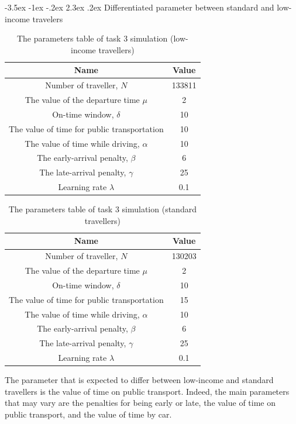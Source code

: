 \documentclass[a4paper, 12pt,oneside]{article}
\makeatletter
\renewcommand{\subsection}{\@startsection {subsection}{1}{\z@}%
             {-3.5ex \@plus -1ex \@minus -.2ex}%
             {2.3ex \@plus.2ex}%
             {\normalfont\normalsize\bfseries}}
\makeatother
\begin{document}
\subsection{Differentiated parameter between standard and low-income travelers}
\begin{table}[]
    \centering
    \begin{tabular}{c|c}
        Name & Value \\
        \hline
        Number of traveller, $N$& 133811\\
        The value of the departure time $\mu$ & 2\\
        On-time window, $\delta$ & 10\\
        The value of time for public transportation & 10\\
        The value of time while driving, $\alpha$ & 10\\
        The early-arrival penalty, $\beta$ & 6\\
        The late-arrival penalty, $\gamma$ & 25\\
        Learning rate $\lambda$ & 0.1\\
        
    \end{tabular}
    \caption{The parameters table of task 3 simulation (low-income travellers)}
    \label{tab:The parameters table of task 3 simulation (low-income travellers)}
\end{table}
\begin{table}[]
    \centering
    \begin{tabular}{c|c}
        Name & Value \\
        \hline
        Number of traveller, $N$& 130203\\
        The value of the departure time $\mu$ & 2\\
        On-time window, $\delta$ & 10\\
        The value of time for public transportation & 15\\
        The value of time while driving, $\alpha$ & 10\\
        The early-arrival penalty, $\beta$ & 6\\
        The late-arrival penalty, $\gamma$ & 25\\
        Learning rate $\lambda$ & 0.1\\
        
    \end{tabular}
    \caption{The parameters table of task 3 simulation (standard travellers)}
    \label{tab:The parameters table of task 3 simulation (standard travellers)}
\end{table}
The parameter that is expected to differ between low-income and standard travellers is the value of time on public transport. Indeed, the main parameters that may vary are the penalties for being early or late, the value of time on public transport, and the value of time by car.\\
\end{document}
